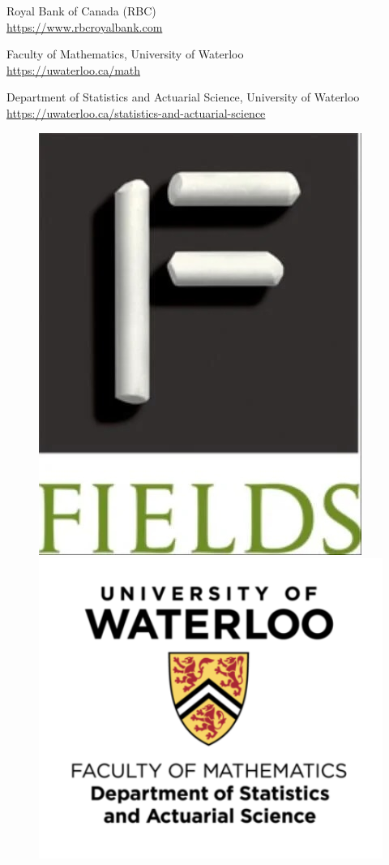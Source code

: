 Royal Bank of Canada (RBC)\\
\url{https://www.rbcroyalbank.com}

Faculty of Mathematics, University of Waterloo\\
\url{https://uwaterloo.ca/math}

Department of Statistics and Actuarial Science, University of Waterloo\\
\url{https://uwaterloo.ca/statistics-and-actuarial-science}\\

\begin{figure}[ht]
\includegraphics[scale =0.2]{fields_logo_extralarge.jpeg}
\hfill
\includegraphics[scale =0.5]{UW.png}

\end{figure}
